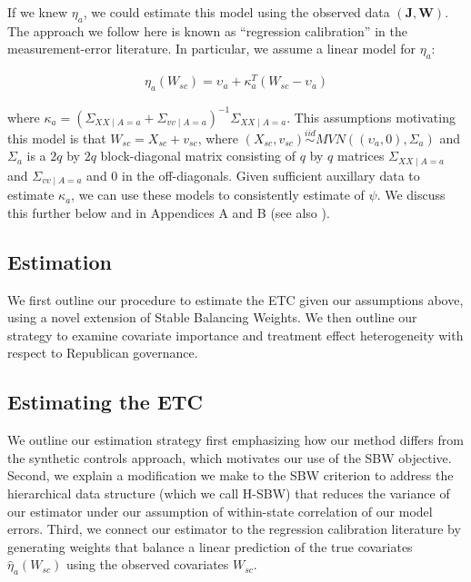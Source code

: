 \documentclass[aoas]{imsart}
\theoremstyle{plain}
\newcommand{\matr}[1]{\mathbf{#1}} %
\theoremstyle{remark}
\begin{document}
If we knew $\eta_a$, we could estimate this model using the observed data $(\matr{J}, \matr{W})$. The approach we follow here is known as ``regression calibration'' in the measurement-error literature. In particular, we assume a linear model for $\eta_a$:

\begin{align*}
\eta_a(W_{sc}) = \upsilon_a + \kappa_a^T(W_{sc} - \upsilon_a)
\end{align*}

where $\kappa_a = (\Sigma_{XX \mid A = a} + \Sigma_{vv \mid A = a})^{-1}\Sigma_{XX \mid A = a}$. This assumptions motivating this model is that $W_{sc} = X_{sc} + v_{sc}$, where $(X_{sc}, v_{sc}) \stackrel{iid}\sim MVN((\upsilon_a, 0), \Sigma_a)$ and $\Sigma_a$ is a $2q$ by $2q$ block-diagonal matrix consisting of $q$ by $q$ matrices $\Sigma_{XX \mid A = a}$ and $\Sigma_{vv \mid A = a}$ and $0$ in the off-diagonals. Given sufficient auxillary data to estimate $\kappa_a$, we can use these models to consistently estimate of $\psi$. We discuss this further below and in Appendices A and B (see also \cite{gleser1992importance}).

\subsection{Estimation}

We first outline our procedure to estimate the ETC given our assumptions above, using a novel extension of Stable Balancing Weights. We then outline our strategy to examine covariate importance and treatment effect heterogeneity with respect to Republican governance.

\subsection{Estimating the ETC}

We outline our estimation strategy first emphasizing how our method differs from the synthetic controls approach, which motivates our use of the SBW objective. Second, we explain a modification we make to the SBW criterion to address the hierarchical data structure (which we call H-SBW) that reduces the variance of our estimator under our assumption of within-state correlation of our model errors. Third, we connect our estimator to the regression calibration literature by generating weights that balance a linear prediction of the true covariates $\hat{\eta}_a(W_{sc})$ using the observed covariates $W_{sc}$. 
\end{document}
